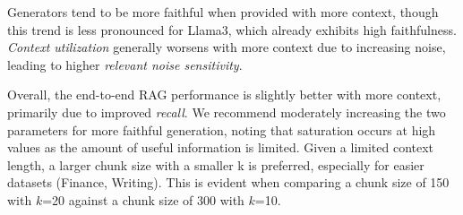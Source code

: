 Generators tend to be more faithful when provided with more context, though this trend is less pronounced for Llama3, which already exhibits high faithfulness. \emph{Context utilization} generally worsens with more context due to increasing noise, leading to higher \emph{relevant noise sensitivity}.

Overall, the end-to-end RAG performance is slightly better with more context, primarily due to improved \emph{recall}. We recommend moderately increasing the two parameters for more faithful generation, noting that saturation occurs at high values as the amount of useful information is limited. Given a limited context length, a larger chunk size with a smaller k is preferred, especially for easier datasets (Finance, Writing). This is evident when comparing a chunk size of 150 with $k$=20 against a chunk size of 300 with $k$=10.






